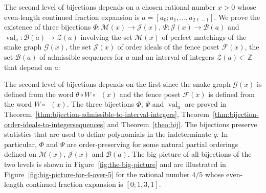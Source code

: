 \documentclass[a4paper,12pt]{amsart}
\newcommand{\Z}{\mathbb{Z}}
\newcommand{\xx}{{x}}
\newcommand{\Bcal}{{\mathcal{B}}}
\newcommand{\Fcal}{{\mathcal{F}}}
\newcommand{\Gcal}{{\mathcal{G}}}
\newcommand{\Jcal}{{\mathcal{J}}}
\newcommand{\Mcal}{{\mathcal{M}}}
\newcommand{\Zcal}{{\mathcal{Z}}}
\newcommand{\0}{\mathtt{0}}
\newcommand{\1}{\mathtt{1}}
\newcommand{\2}{\mathtt{2}}
\newcommand{\3}{\mathtt{3}}
\DeclareMathOperator{\CFeven}{{CF_{\text{even}}}}
\DeclareMathOperator{\val}{val}
\begin{document}
The second level of bijections depends on a
chosen rational number $\xx>0$
whose even-length continued fraction expansion is $a=[a_0;a_1,\dots,a_{2\ell-1}]$.
We prove the existence of three bijections
$\Phi:\Mcal(\xx)\to\Jcal(\xx)$,
$\Psi:\Jcal(\xx)\to\Bcal(a)$ and
$\val_a:\Bcal(a)\to \Zcal(a)$
involving
the set $\Mcal(\xx)$ of perfect matchings of the snake graph $\Gcal(\xx)$,
the set $\Jcal(\xx)$ of order ideals of the fence poset $\Fcal(\xx)$,
the set $\Bcal(a)$ of admissible sequences for $a$
and
an interval of integers $\Zcal(a)\subset\Z$ that depend on $a$:
\begin{center}
\end{center}
The second level of bijections depends on the first since
the snake graph $\Gcal(\xx)$ is defined from the word $\theta\circ W\circ\CFeven(\xx)$
and the fence poset $\Fcal(\xx)$ is defined from the word $W\circ\CFeven(\xx)$.
The three bijections $\Phi$, $\Psi$ and $\val_a$
are proved in
Theorem~\ref{thm:bijection-admissible-to-interval-integers},
Theorem~\ref{thm:bijection-order-ideals-to-integersequences} and
Theorem~\ref{theo:bij}.
The bijections preserve statistics that are used to define polynomials
in the indeterminate $q$.
In particular, $\Phi$ and $\Psi$ are order-preserving
for some natural partial orderings defined on $\Mcal(\xx)$, $\Jcal(\xx)$ and $\Bcal(a)$.
The big picture of all bijections of the two levels is shown in
Figure~\ref{fig:the-big-picture}
and are illustrated in
Figure~\ref{fig:big-picture-for-4-over-5} for the rational number $4/5$ whose
even-length continued fraction expansion is $[0;1,3,1]$.

%
%
%
%
%
%
%
%
%
\end{document}
